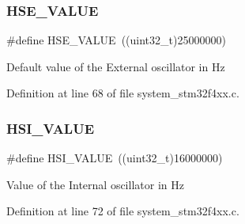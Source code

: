 \subsubsection{\texorpdfstring{H\+S\+E\+\_\+\+V\+A\+L\+UE}{HSE\_VALUE}}
{\footnotesize\ttfamily \#define H\+S\+E\+\_\+\+V\+A\+L\+UE~((uint32\+\_\+t)25000000)}

Default value of the External oscillator in Hz 

Definition at line 68 of file system\+\_\+stm32f4xx.\+c.

\mbox{\label{group___s_t_m32_f4xx___system___private___includes_gaaa8c76e274d0f6dd2cefb5d0b17fbc37}} 
\subsubsection{\texorpdfstring{H\+S\+I\+\_\+\+V\+A\+L\+UE}{HSI\_VALUE}}
{\footnotesize\ttfamily \#define H\+S\+I\+\_\+\+V\+A\+L\+UE~((uint32\+\_\+t)16000000)}

Value of the Internal oscillator in Hz 

Definition at line 72 of file system\+\_\+stm32f4xx.\+c.

